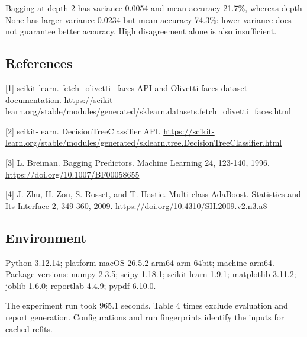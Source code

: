 \documentclass[10pt,twocolumn,letterpaper]{article}
\begin{document}
Bagging at depth 2 has variance 0.0054 and mean accuracy 21.7\%, whereas depth None has larger variance 0.0234 but mean accuracy 74.3\%: lower variance does not guarantee better accuracy. High disagreement alone is also insufficient.

\subsection*{References}
[1] scikit-learn. fetch\_olivetti\_faces API and Olivetti faces dataset documentation. \url{https://scikit-learn.org/stable/modules/generated/sklearn.datasets.fetch_olivetti_faces.html}

[2] scikit-learn. DecisionTreeClassifier API. \url{https://scikit-learn.org/stable/modules/generated/sklearn.tree.DecisionTreeClassifier.html}

[3] L. Breiman. Bagging Predictors. Machine Learning 24, 123-140, 1996. \url{https://doi.org/10.1007/BF00058655}

[4] J. Zhu, H. Zou, S. Rosset, and T. Hastie. Multi-class AdaBoost. Statistics and Its Interface 2, 349-360, 2009. \url{https://doi.org/10.4310/SII.2009.v2.n3.a8}

\subsection*{Environment}
Python 3.12.14; platform macOS-26.5.2-arm64-arm-64bit; machine arm64. Package versions: numpy 2.3.5; scipy 1.18.1; scikit-learn 1.9.1; matplotlib 3.11.2; joblib 1.6.0; reportlab 4.4.9; pypdf 6.10.0.

The experiment run took 965.1 seconds. Table 4 times exclude evaluation and report generation. Configurations and run fingerprints identify the inputs for cached refits.
\end{document}
